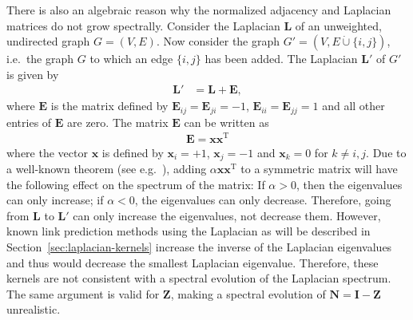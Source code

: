 \documentclass[11pt,a4paper]{book}
\newcommand{\dunion}{\mathbin{\dot\cup}} %
\begin{document}
There is also an algebraic reason why the normalized adjacency and
Laplacian matrices do not grow spectrally.  
Consider the Laplacian $\mathbf L$ of an unweighted, undirected graph
$G=(V,E)$.  Now consider the graph $G'= (V, E\dunion \{i,j\})$,
i.e.\ the graph $G$ to which an edge $\{i,j\}$ has been added.
The Laplacian $\mathbf L'$ of $G'$ is given by 
\begin{align*}
  \mathbf L' &= \mathbf L + \mathbf E,
\end{align*}
where $\mathbf E$ is the matrix defined by $\mathbf E_{ij}=\mathbf
E_{ji}=-1$, $\mathbf E_{ii}=\mathbf E_{jj}=1$ and all other entries of
$\mathbf E$ are zero.  The matrix $\mathbf E$ can be written as 
\begin{align*}
  \mathbf E = \mathbf x \mathbf x^{\mathrm T}
\end{align*}
where the vector $\mathbf x$ is defined by $\mathbf x_i=+1$, $\mathbf
x_j=-1$ and $\mathbf x_k = 0$ for $k\neq i, j$.  Due to a well-known
theorem (see e.g.~\cite[p.~97]{b663}), adding $\alpha \mathbf x \mathbf
x^{\mathrm T}$ to a symmetric matrix will have the following effect on 
the spectrum of the matrix: If $\alpha>0$, then the eigenvalues can only
increase; if $\alpha<0$, the eigenvalues can only decrease. Therefore,
going from $\mathbf L$ to $\mathbf L'$ can only increase the
eigenvalues, not decrease them.  However, known link prediction methods
using the Laplacian as will be described in
Section~\ref{sec:laplacian-kernels} increase the inverse of the
Laplacian eigenvalues and thus would decrease the smallest Laplacian
eigenvalue.  Therefore, these kernels are not consistent with 
a spectral evolution of the Laplacian spectrum.  The same argument is
valid for $\mathbf Z$, making a spectral evolution of $\mathbf N=\mathbf
I - \mathbf Z$ unrealistic.
\end{document}
